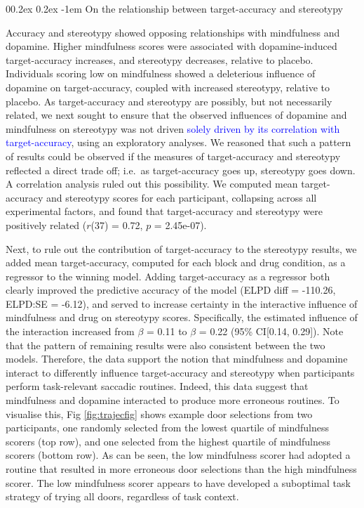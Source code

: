 \documentclass[
  man]{apa6}
\makeatletter
\let\oldparagraph\paragraph
\renewcommand{\paragraph}[1]{\oldparagraph{#1}\mbox{}}
\renewcommand{\paragraph}{\@startsection{paragraph}{4}{\parindent}%
  {0\baselineskip \@plus 0.2ex \@minus 0.2ex}%
  {-1em}%
  {\normalfont\normalsize\bfseries\itshape\typesectitle}}
\makeatother
\begin{document}
\hypertarget{on-the-relationship-between-target-accuracy-and-stereotypy}{%
\paragraph{On the relationship between target-accuracy and stereotypy}\label{on-the-relationship-between-target-accuracy-and-stereotypy}}

Accuracy and stereotypy showed opposing relationships with mindfulness and dopamine. Higher mindfulness scores were associated with dopamine-induced target-accuracy increases, and stereotypy decreases, relative to placebo. Individuals scoring low on mindfulness showed a deleterious influence of dopamine on target-accuracy, coupled with increased stereotypy, relative to placebo. As target-accuracy and stereotypy are possibly, but not necessarily related, we next sought to ensure that the observed influences of dopamine and mindfulness on stereotypy was not driven \textcolor{blue}{solely driven by its correlation with target-accuracy}, using an exploratory analyses. We reasoned that such a pattern of results could be observed if the measures of target-accuracy and stereotypy reflected a direct trade off; i.e.~as target-accuracy goes up, stereotypy goes down. A correlation analysis ruled out this possibility. We computed mean target-accuracy and stereotypy scores for each participant, collapsing across all experimental factors, and found that target-accuracy and stereotypy were positively related (\(r\)(37) = 0.72, \(p\) = 2.45e-07).

Next, to rule out the contribution of target-accuracy to the stereotypy results, we added mean target-accuracy, computed for each block and drug condition, as a regressor to the winning model. Adding target-accuracy as a regressor both clearly improved the predictive accuracy of the model (ELPD diff = -110.26, ELPD:SE = -6.12), and served to increase certainty in the interactive influence of mindfulness and drug on stereotypy scores. Specifically, the estimated influence of the interaction increased from \(\beta\) = 0.11 to \(\beta\) = 0.22 (95\% CI{[}0.14, 0.29{]}). Note that the pattern of remaining results were also consistent between the two models. Therefore, the data support the notion that mindfulness and dopamine interact to differently influence target-accuracy and stereotypy when participants perform task-relevant saccadic routines. Indeed, this data suggest that mindfulness and dopamine interacted to produce more erroneous routines. To visualise this, Fig \ref{fig:trajecfig} shows example door selections from two participants, one randomly selected from the lowest quartile of mindfulness scorers (top row), and one selected from the highest quartile of mindfulness scorers (bottom row). As can be seen, the low mindfulness scorer had adopted a routine that resulted in more erroneous door selections than the high mindfulness scorer. The low mindfulness scorer appears to have developed a suboptimal task strategy of trying all doors, regardless of task context.
\end{document}
